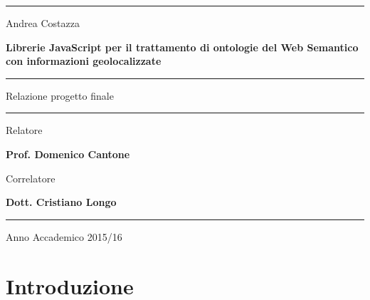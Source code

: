 \documentclass[a4paper,11pt]{article}
\begin{document}
\begin{center}
	\hrule
\end{center}

\vspace*{50pt}

\begin{center}
	\LARGE Andrea Costazza
\end{center}

\vspace*{30pt}

\begin{center}
	\LARGE \textbf{Librerie JavaScript per il trattamento di ontologie del Web Semantico con informazioni geolocalizzate}

\end{center}


\vspace*{80pt}

\noindent\hfil\rule{0.2\textwidth}{.4pt}\hfil

\begin{center}
	\Large Relazione progetto finale
\end{center}

\noindent\hfil\rule{0.2\textwidth}{.4pt}\hfil

\vspace*{180pt}

\begin{flushright}
	\Large Relatore

	\Large \textbf {Prof. Domenico Cantone}
\end{flushright}
\begin{flushright}
	\Large Correlatore

	\Large \textbf {Dott. Cristiano Longo}
\end{flushright}

\bigskip
\bigskip

\hrule

\begin{center}
	\Large Anno Accademico 2015/16
\end{center}
\thispagestyle{empty}
\newpage
\null
\thispagestyle{empty}

\newpage

\tableofcontents
\newpage

\section{Introduzione}


\newpage
\end{document}
